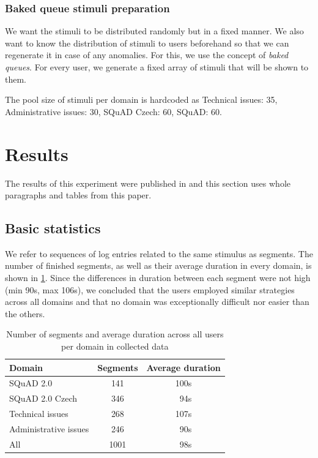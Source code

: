 \subsubsection{Baked queue stimuli preparation}

We want the stimuli to be distributed randomly but in a fixed manner. We also want to know the distribution of stimuli to users beforehand so that we can regenerate it in case of any anomalies. For this, we use the concept of \textit{baked queues}. For every user, we generate a fixed array of stimuli that will be shown to them.

The pool size of stimuli per domain is hardcoded as Technical issues: 35, Administrative issues: 30, SQuAD Czech: 60, SQuAD: 60.

\section{Results} \label{sec:experiment_validation}

The results of this experiment were published in \cite{zouhar:ptakopet} and this section uses whole paragraphs and tables from this paper.

\subsection{Basic statistics}

We refer to sequences of log entries related to the same stimulus as segments. The number of finished segments, as well as their average duration in every domain, is shown in \cref{tab:segments_avg_duration}. Since the differences in duration between each segment were not high (min 90s, max 106s), we concluded that the users employed similar strategies across all domains and that no domain was exceptionally difficult nor easier than the others.

\begin{table}[ht]
    \centering
    \begin{tabular}{| l c c |}
        \hline
        Domain & Segments & Average duration \\
        \hline
        SQuAD 2.0 & 141 & 100s  \\
        SQuAD 2.0 Czech & 346 & \ 94s \\
        Technical issues & 268 & 107s \\
        Administrative issues & 246 & \ 90s \\
        \hline
        All & 1001 & \ 98s \\
        \hline
    \end{tabular}
    \caption{\label{tab:segments_avg_duration} Number of segments and average duration across all users per domain in collected data}
    \vspace{-0.9cm}
\end{table}

